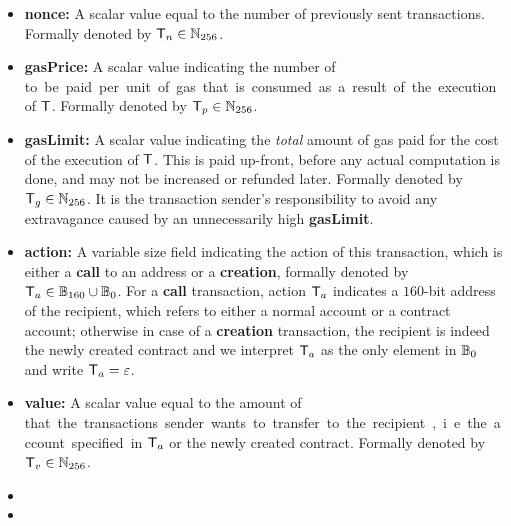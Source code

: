 \begin{itemize} [nosep]
	\item {\bf nonce:} A scalar value equal to the number of previously sent transactions. Formally denoted by $\textsf{T}_n \in\mathbb{N}_{256}$.

	\item {\bf gasPrice:} A scalar value indicating the number of \unit to be paid per unit of gas that is consumed as a result of the execution of $\textsf{T}$. Formally denoted by $\textsf{T}_p\in\mathbb{N}_{256}$.

	\item {\bf gasLimit:} A scalar value indicating the \emph{total} amount of gas paid for the cost of the execution of $\textsf{T}$. This is paid up-front, before any actual computation is done, and may not be increased or refunded later. 
	Formally denoted by $\textsf{T}_g\in\mathbb{N}_{256}$.
	It is the transaction sender's responsibility to avoid any extravagance caused by an unnecessarily high {\bf gasLimit}.

	\item {\bf action:} 
	A variable size field indicating the action of this transaction, which is either a \textbf{call} to an address or a \textbf{creation}, formally denoted by $\textsf{T}_a\in \mathbb{B}_{160}\cup\mathbb{B}_0$. 
	For a \textbf{call} transaction, action $\textsf{T}_a$ indicates a $160$-bit address of the recipient, which refers to either a normal account or a contract account;
	otherwise in case of a \textbf{creation} transaction, the recipient is indeed the newly created contract and we interpret $\textsf{T}_a$ as the only element in $\mathbb{B}_0$ and write $\textsf{T}_a = \mathbb{\varepsilon}$.

	\item {\bf value:} A scalar value equal to the amount of \unit that the transactions sender wants to transfer to the recipient, i.e. the account specified in $\textsf{T}_a$ or the newly created contract.
	Formally denoted by $\textsf{T}_v\in\mathbb{N}_{256}$.


	\item {}

	\item {}


\end{itemize}
